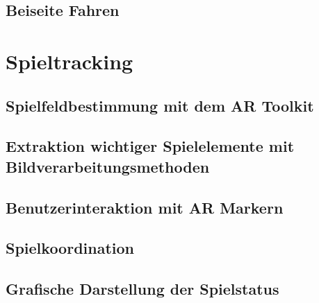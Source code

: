 \subsection{Beiseite Fahren} %

\section{Spieltracking} %

\subsection{Spielfeldbestimmung mit dem AR Toolkit} %

\subsection{Extraktion wichtiger Spielelemente mit Bildverarbeitungsmethoden} %

\subsection{Benutzerinteraktion mit AR Markern} %

\subsection{Spielkoordination} %

\subsection{Grafische Darstellung der Spielstatus} %